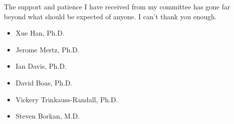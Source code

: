 The support and patience I have received from my committee has gone far beyond what should be expected of anyone. I can't thank you enough.
\begin{itemize}
\item Xue Han, Ph.D.
\item Jerome Mertz, Ph.D.
\item Ian Davis, Ph.D.
\item David Boas, Ph.D.
\item Vickery Trinkauss-Randall, Ph.D.
\item Steven Borkan, M.D.
\end{itemize}

\vskip 1in


